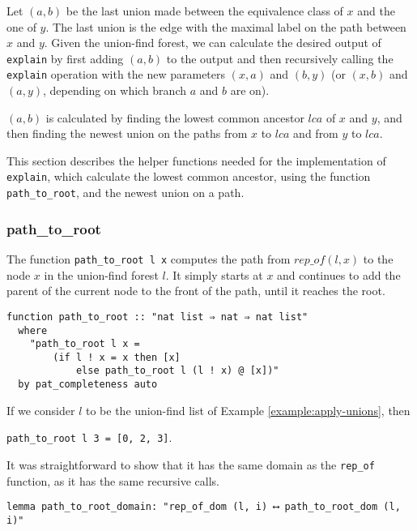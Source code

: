 Let $(a, b)$ be the last union made between the equivalence class of $x$ and the one of $y$.
The last union is the edge with the maximal label on the path between $x$ and $y$.
Given the union-find forest, we can calculate the desired output of \lstinline|explain| by first adding  $(a, b)$ to the output and then recursively calling the \lstinline|explain| operation with the new parameters $(x, a)$ and $(b, y)$ (or $(x, b)$ and $(a, y)$, depending on which branch $a$ and $b$ are on).

$(a, b)$ is calculated by finding the lowest common ancestor $lca$ of $x$ and $y$, and then finding the newest union on the paths from $x$ to $lca$ and from $y$ to $lca$.

This section describes the helper functions needed for the implementation of \lstinline|explain|, which calculate the lowest common ancestor, using the function \lstinline{path_to_root}, and the newest union on a path.

\subsubsection{path\_to\_root}
\label{subsubsection:path-to-root}

The function \lstinline{path_to_root l x} computes the path from $rep\_of(l,x)$ to the node $x$ in the union-find forest $l$. It simply starts at $x$ and continues to add the parent of the current node to the front of the path, until it reaches the root.

\begin{lstlisting}
function path_to_root :: "nat list ⇒ nat ⇒ nat list"
  where
    "path_to_root l x =
        (if l ! x = x then [x]
            else path_to_root l (l ! x) @ [x])"
  by pat_completeness auto
\end{lstlisting}

\begin{exmp}
If we consider $l$ to be the union-find list of Example \ref{example:apply-unions}, then

\lstinline|path_to_root l 3 = [0, 2, 3]|.
\end{exmp}

It was straightforward to show that it has the same domain as the \lstinline{rep_of} function, as it has the same recursive calls.

\begin{lstlisting}
lemma path_to_root_domain: "rep_of_dom (l, i) ⟷ path_to_root_dom (l, i)"
\end{lstlisting}

